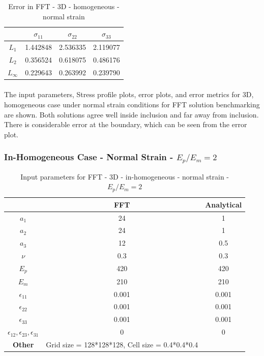 \documentclass[12pt, a4paper]{report}
\begin{document}
\begin{table}[H]
    \centering
    \begin{tabular}{|c|c|c|c|}
        \hline
        &\textbf{$\sigma_{11}$} &  \textbf{$\sigma_{22}$} & \textbf{$\sigma_{33}$}\\
        \hline
        $L_1$ & 1.442848 & 2.536335 & 2.119077 \\
        \hline
        $L_2$ & 0.356524 & 0.618075 & 0.486176 \\
        \hline 
        $L_\infty$ & 0.229643 & 0.263992 & 0.239790 \\
        \hline
    \end{tabular}
    \caption{Error in FFT - 3D - homogeneous - normal strain}
\end{table}  

\paragraph{}
The input parameters, Stress profile plots, error plots, and error metrics for 3D, homogeneous case under normal strain conditions for FFT solution benchmarking are shown. Both solutions agree well inside inclusion and far away from inclusion. There is considerable error at the boundary, which can be seen from the error plot.

\newpage

\subsubsection{In-Homogeneous Case - Normal Strain - $E_p/E_m = 2$}
\begin{table}[H]
    \centering
    \begin{tabular}{|c|c|c|}
        \hline
        & \textbf{FFT} &\textbf{Analytical}\\
        \hline
        \textbf{$a_1$} & 24 & 1 \\
        \hline
        \textbf{$a_2$} & 24 & 1 \\
        \hline
        \textbf{$a_3$} & 12 & 0.5 \\
        \hline
        \textbf{$\nu$} & 0.3 & 0.3 \\
        \hline
        \textbf{$E_p$} & 420 & 420 \\
        \hline
        \textbf{$E_m$} & 210 & 210 \\
        \hline
        \textbf{$\epsilon_{11}$} & 0.001 & 0.001 \\
        \hline
        \textbf{$\epsilon_{22}$} & 0.001 & 0.001 \\
        \hline
        \textbf{$\epsilon_{33}$} & 0.001 & 0.001 \\
        \hline
        \textbf{$\epsilon_{12}, \epsilon_{23}, \epsilon_{31}$} & 0 & 0 \\
        \hline
        \textbf{Other} & Grid size = 128*128*128, Cell size = 0.4*0.4*0.4 &  \\
        \hline
    \end{tabular}
    \caption{Input parameters for FFT - 3D - in-homogeneous - normal strain - $E_p/E_m = 2$}
\end{table}
\end{document}
